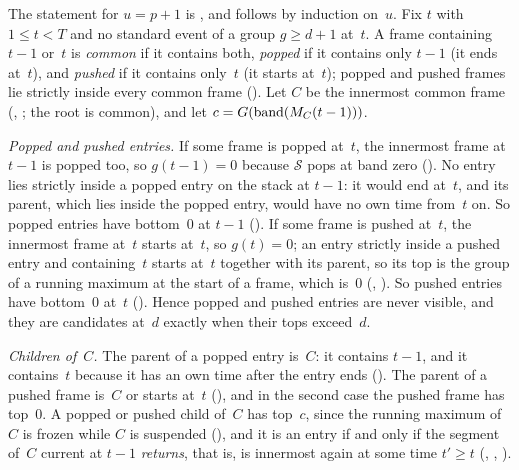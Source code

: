 \begin{outline}
The statement for $u=p+1$ is , and  follows by induction on~$u$. Fix
$t$ with $1\le t<T$ and no standard event of a group $g\ge d+1$ at~$t$. A frame containing $t-1$ or~$t$ is \emph{common} if it
contains both, \emph{popped} if it contains only $t-1$ (it ends at~$t$), and \emph{pushed} if it contains only~$t$ (it starts
at~$t$); popped and pushed frames lie strictly inside every common frame (). Let $C$ be
the innermost common frame (, ; the root is common),
and let $c=G(\operatorname{band}(M_C(t-1)))$.

\emph{Popped and pushed entries.} If some frame is popped at~$t$, the innermost frame at $t-1$ is popped too, so $g(t-1)=0$ because
$\mathcal S$ pops at band zero (). No entry lies strictly inside a popped entry on the stack at
$t-1$: it would end at~$t$, and its parent, which lies inside the popped entry, would have no own time from~$t$ on. So popped
entries have bottom~$0$ at $t-1$ (). If some frame is pushed at~$t$, the innermost frame at~$t$
starts at~$t$, so $g(t)=0$; an entry strictly inside a pushed entry and containing~$t$ starts at~$t$ together with its parent, so its
top is the group of a running maximum at the start of a frame, which is~$0$ (,
). So pushed entries have bottom~$0$ at~$t$ (). Hence popped
and pushed entries are never visible, and they are candidates at~$d$ exactly when their tops exceed~$d$.

\emph{Children of~$C$.} The parent of a popped entry is~$C$: it contains $t-1$, and it contains~$t$ because it has an own time after
the entry ends (). The parent of a pushed frame is~$C$ or starts at~$t$
(), and in the second case the pushed frame has top~$0$. A popped or pushed child of~$C$ has
top~$c$, since the
running maximum of~$C$ is frozen while $C$ is suspended (), and it is an entry if and only if the
segment of~$C$ current at $t-1$ \emph{returns}, that is, is innermost again at some time $t'\ge t$ (,
, ).


\end{outline}
